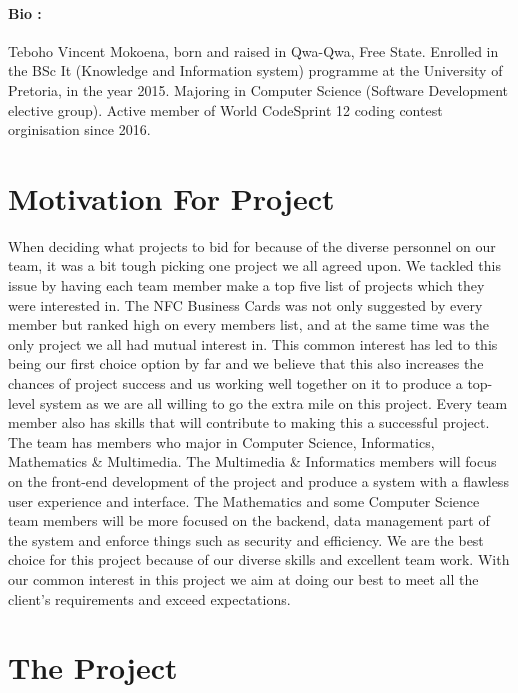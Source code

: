 \documentclass[11pt]{article}
\begin{document}
\paragraph{Bio :} Teboho Vincent Mokoena, born and raised in Qwa-Qwa, Free State. Enrolled in
the BSc It (Knowledge and Information system) programme at the University of
Pretoria, in the year 2015. Majoring in Computer Science (Software
Development elective group). Active member of World CodeSprint 12 coding
contest orginisation since 2016.

\section{Motivation For Project}
When deciding what projects to bid for because of the diverse personnel on our team, it was a bit tough picking one project we all agreed upon. We tackled this issue by having each team member make a top five list of projects which they were interested in. The NFC Business Cards was not only suggested by every member but ranked high on every members list, and at the same time was the only project we all had mutual interest in. This common interest has led to this being our first choice option by far and we believe that this also increases the chances of project success and us working well together on it to produce a top-level system as we are all willing to go the extra mile on this project.
\newline
\newline Every team member also has skills that will contribute to making this a successful project. The team has members who major in Computer Science, Informatics, Mathematics \& Multimedia. The Multimedia \& Informatics members will focus on the front-end development of the project and produce a system with a flawless user experience and interface. The Mathematics and some Computer Science team members will be more focused on the backend, data management part of the system and enforce things such as security and efficiency.
\newline
\newline We are the best choice for this project because of our diverse skills and excellent team work. With our common interest in this project we aim at doing our best to meet all the client's requirements and exceed expectations.

\section{The Project}
\end{document}
